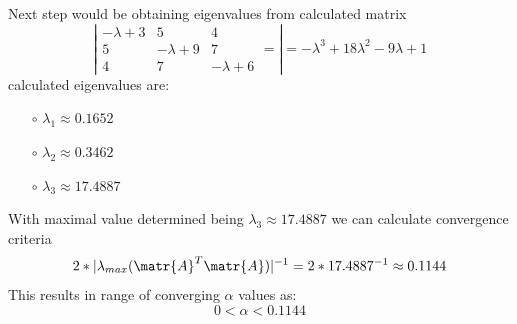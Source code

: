 \begin{itemize}
\begin{equation*}
  \end{equation*}
  Next step would be obtaining eigenvalues from calculated matrix 
  \begin{equation*}
    \left|\begin{matrix}
      -\lambda+3 & 5 & 4 \\
      5 & -\lambda+9 & 7 \\
      4 & 7 & -\lambda+6
      \end{matrix}=\right|
      = -\lambda^3 + 18\lambda^2 - 9\lambda + 1
  \end{equation*}
  calculated eigenvalues are: 
  \begin{multicols}{3}
    \begin{itemize}
      \item[$\circ$] $\lambda_1 \approx 0.1652 $
      \par
      \item[$\circ$] $\lambda_2 \approx 0.3462 $
      \par
      \item[$\circ$] $\lambda_3 \approx 17.4887 $
    \end{itemize}
  \end{multicols}
  With maximal value determined being $\lambda_3 \approx 17.4887$ we can calculate convergence criteria 
  \begin{equation*}
    2 * |\lambda_{max}(\matr{A}^T\matr{A})|^{-1} = 2 * 17.4887^{-1} \approx 0.1144
  \end{equation*}
  This results in range of converging $\alpha$ values as:
  \begin{equation*}
    0 < \alpha < 0.1144
  \end{equation*}
\end{itemize}

